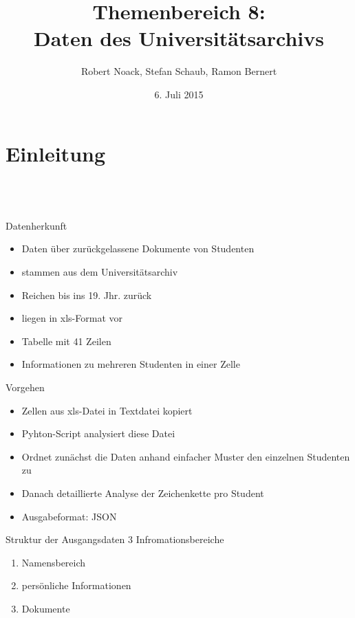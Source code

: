 \documentclass[12pt]{beamer}
\author{Robert Noack, Stefan Schaub, Ramon Bernert}
\title{\textbf{Themenbereich 8: \\Daten des Universitätsarchivs}}
\date{6. Juli 2015}
\begin{document}
\begin{large}
\section*{}
\begin{frame}
\titlepage
\end{frame}

\begin{frame}
\tableofcontents
\end{frame}

\section{Einleitung}
 \subsection*{~}
\begin{frame}{Datenherkunft}
 \begin{itemize}
  \item Daten über zurückgelassene Dokumente von Studenten
  \item stammen aus dem Universitätsarchiv
  \item Reichen bis ins 19. Jhr. zurück
  \item liegen in xls-Format vor
  \item Tabelle mit 41 Zeilen
  \item Informationen zu mehreren Studenten in einer Zelle
 \end{itemize}

\end{frame}


\begin{frame}{Vorgehen}
 \begin{itemize}
  \item Zellen aus xls-Datei in Textdatei kopiert
  \item Pyhton-Script analysiert diese Datei
  \item Ordnet zunächst die Daten anhand einfacher Muster den einzelnen Studenten zu
  \item Danach detaillierte Analyse der Zeichenkette pro Student
  \item Ausgabeformat: JSON
 \end{itemize}
\end{frame}


\begin{frame}{Struktur der Ausgangsdaten}
3 Infromationsbereiche
 \begin{enumerate}
  \item Namensbereich
  \item persönliche Informationen
  \item Dokumente
 \end{enumerate}


\end{frame}
\end{large}
\end{document}
